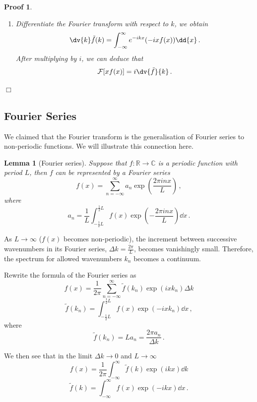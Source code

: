 \documentclass{article}
\theoremstyle{plain}\theoremheaderfont{\normalfont\itshape}\theorembodyfont{\rmfamily}\theoremseparator{.}\newtheorem*{rem}{Remark}\newtheorem*{ex}{Example}\newtheorem*{proof}{Proof}\newtheorem*{altp}{Alternative proof}
\theoremstyle{plain}\theoremheaderfont{\normalfont\bfseries}\theorembodyfont{\rmfamily}\theoremseparator{.}\newtheorem{thm}{Theorem}[section]\newtheorem{lem}[thm]{Lemma}\newtheorem{prop}[thm]{Proposition}\newtheorem*{cor}{Corollary}\newtheorem{defn}[thm]{Definition}\newtheorem{clm}[thm]{Claim}\newtheorem{clminproof}{Claim}
\theoremstyle{break}\theoremheaderfont{\normalfont\itshape}\theorembodyfont{\rmfamily}\theoremseparator{.\medskip}\newtheorem*{proofskip}{Proof}\newtheorem*{exs}{Examples}\newtheorem*{rems}{Remarks}
\theoremstyle{break}\theoremheaderfont{\normalfont\bfseries}\theorembodyfont{\rmfamily}\theoremseparator{.\medskip}\newtheorem{lemskip}[thm]{Lemma}\newtheorem{defnskip}[thm]{Definition}\newtheorem{propskip}[thm]{Proposition}\newtheorem{thmskip}[thm]{Theorem}
\numberwithin{equation}{section}
\newcommand{\qed}{\hfill\ensuremath{\Box}}
\begin{document}
\begin{proofskip}
\begin{enumerate}[parsep=1em]
			Alternatively, here is another proof.
			\begin{align*}
				\mathcal{F}\qty[\dv{f}{x}]&=\int_{-\infty}^{\infty}f'(x)e^{-ikx}\dd{x}\\
				&=\qty[f(x)e^{-ikx}]_{-\infty}^{\infty}-\int_{-\infty}^{\infty}-ikf(x)e^{-ikx}\dd{x}\\
				&=ik\tilde{f}(k)\,,
			\end{align*}
			where the former part vanishes because \(f(x)\to 0\) as \(x\to\pm\infty\) for the Fourier transform to converge.		
			\item Differentiate the Fourier transform with respect to \(k\), we obtain
			\[\dv{k} \tilde{f}(k)=\int_{-\infty}^{\infty}e^{-ikx}(-ixf(x))\dd{x}\,.\]
			After multiplying by \(i\), we can deduce that
			\[\mathcal{F}[x f(x)]=i\dv{\tilde{f}}{k}\,.\]
		\end{enumerate}\qed
	\end{proofskip}
	
	\subsection{Fourier Series}
	We claimed that the Fourier transform is the generalisation of Fourier series to non-periodic functions. We will illustrate this connection here.
	\begin{lem}[Fourier series]
		Suppose that \(f:\mathbb{R}\to\mathbb{C}\) is a periodic function with period \(L\), then \(f\) can be represented by a \textit{Fourier series}
		\[f(x)=\sum_{n=-\infty}^{\infty}a_n \exp(\frac{2\pi inx}{L})\,,\]
		where
		\[a_n=\frac{1}{L}\int_{-\frac{1}{2}L}^{\frac{1}{2}L}f(x)\exp(-\frac{2\pi inx}{L})\dd{x}\,.\]
	\end{lem}
	
	As \(L\to\infty\) (\(f(x)\) becomes non-periodic), the increment between successive wavenumbers in its Fourier series, \(\Delta k=\frac{2\pi}{L}\), becomes vanishingly small. Therefore, the spectrum for allowed wavenumbers \(k_n\) becomes a continuum.
	
	Rewrite the formula of the Fourier series as
	\[f(x)=\frac{1}{2\pi}\sum_{n=-\infty}^{\infty}\tilde{f}(k_n)\exp(ixk_n)\Delta k\]
	\[\tilde{f}(k_n)=\int_{-\frac{1}{2}L}^{\frac{1}{2}L}f(x)\exp(-ixk_n)\dd{x}\,,\]
	where
	\[\tilde{f}(k_n)=La_n=\frac{2\pi a_n}{\Delta k}\,.\]
	
	We then see that in the limit \(\Delta k\to0\) and \(L\to\infty\)
	\[f(x)=\frac{1}{2\pi}\int_{-\infty}^{\infty}\tilde{f}(k)\exp(ikx)\dd{k}\]
	\[\tilde{f}(k)=\int_{-\infty}^{\infty}f(x)\exp(-ikx)\dd{x}\,.\]
	
\end{document}
